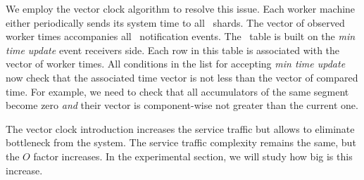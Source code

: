 We employ the vector clock algorithm to resolve this issue. Each worker machine either periodically sends its system time to all \tracker\ shards. The vector of observed worker times accompanies all \tracker\ notification events. The \tracker\ table is built on the \textit{min time update} event receivers side. Each row in this table is associated with the vector of worker times. All conditions in the list for accepting \textit{min time update} now check that the associated time vector is not less than the vector of compared time. For example, we need to check that all accumulators of the same segment become zero \textit{and} their vector is component-wise not greater than the current one.

The vector clock introduction increases the service traffic but allows to eliminate bottleneck from the system. The service traffic complexity remains the same, but the $O$ factor increases. In the experimental section, we will study how big is this increase.


